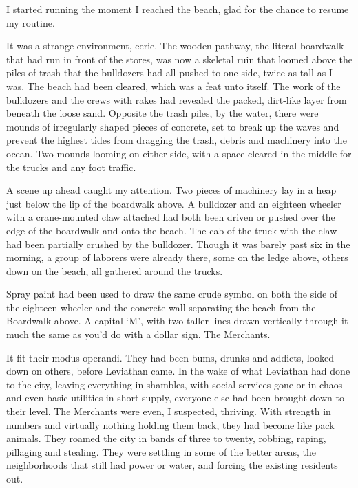 I started running the moment I reached the beach, glad for the chance to resume my routine.



It was a strange environment, eerie.  The wooden pathway, the literal boardwalk that had run in front of the stores, was now a skeletal ruin that loomed above the piles of trash that the bulldozers had all pushed to one side, twice as tall as I was.  The beach had been cleared, which was a feat unto itself.   The work of the bulldozers and the crews with rakes had revealed the packed, dirt-like layer from beneath the loose sand.  Opposite the trash piles, by the water, there were mounds of irregularly shaped pieces of concrete, set to break up the waves and prevent the highest tides from dragging the trash, debris and machinery into the ocean.  Two mounds looming on either side, with a space cleared in the middle for the trucks and any foot traffic.



A scene up ahead caught my attention.  Two pieces of machinery lay in a heap just below the lip of the boardwalk above.  A bulldozer and an eighteen wheeler with a crane-mounted claw attached had both been driven or pushed over the edge of the boardwalk and onto the beach.  The cab of the truck with the claw had been partially crushed by the bulldozer. Though it was barely past six in the morning, a group of laborers were already there, some on the ledge above, others down on the beach, all gathered around the trucks.



Spray paint had been used to draw the same crude symbol on both the side of the eighteen wheeler and the concrete wall separating the beach from the Boardwalk above.  A capital `M', with two taller lines drawn vertically through it much the same as you'd do with a dollar sign.  The Merchants.



It fit their modus operandi.  They had been bums, drunks and addicts, looked down on others, before Leviathan came.  In the wake of what Leviathan had done to the city, leaving everything in shambles, with social services gone or in chaos and even basic utilities in short supply, everyone else had been brought down to their level.  The Merchants were even, I suspected, thriving.  With strength in numbers and virtually nothing holding them back, they had become like pack animals.  They roamed the city in bands of three to twenty, robbing, raping, pillaging and stealing.  They were settling in some of the better areas, the neighborhoods that still had power or water, and forcing the existing residents out.



